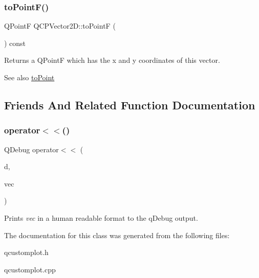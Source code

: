 \subsubsection{\texorpdfstring{to\+Point\+F()}{toPointF()}}
{\footnotesize\ttfamily Q\+PointF Q\+C\+P\+Vector2\+D\+::to\+PointF (\begin{DoxyParamCaption}{ }\end{DoxyParamCaption}) const\hspace{0.3cm}{\ttfamily [inline]}}

Returns a Q\+PointF which has the x and y coordinates of this vector.

\begin{DoxySeeAlso}{See also}
\hyperlink{classQCPVector2D_add3edf75de9b7bf1abc693b973b2e906}{to\+Point} 
\end{DoxySeeAlso}


\subsection{Friends And Related Function Documentation}
\mbox{\label{classQCPVector2D_a6c757af9671d925af4a36c2f58fb7234}} 
\subsubsection{\texorpdfstring{operator$<$$<$()}{operator<<()}}
{\footnotesize\ttfamily Q\+Debug operator$<$$<$ (\begin{DoxyParamCaption}\item[{Q\+Debug}]{d,  }\item[{const \hyperlink{classQCPVector2D}{Q\+C\+P\+Vector2D} \&}]{vec }\end{DoxyParamCaption})\hspace{0.3cm}{\ttfamily [related]}}

Prints {\itshape vec} in a human readable format to the q\+Debug output. 

The documentation for this class was generated from the following files\+:\begin{DoxyCompactItemize}
\item 
qcustomplot.\+h\item 
qcustomplot.\+cpp\end{DoxyCompactItemize}
